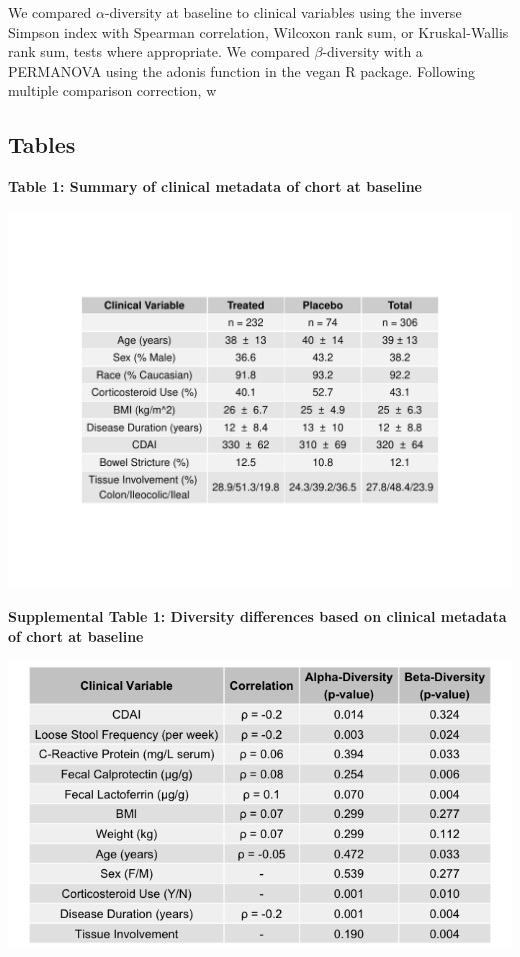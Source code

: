 \documentclass[11pt,]{article}
\begin{document}
We compared \({\alpha}\)-diversity at baseline to clinical variables
using the inverse Simpson index with Spearman correlation, Wilcoxon rank
sum, or Kruskal-Wallis rank sum, tests where appropriate. We compared
\({\beta}\)-diversity with a PERMANOVA using the adonis function in the
vegan R package. Following multiple comparison correction, w

\newpage

\subsection{Tables}\label{tables}

\textbf{Table 1: Summary of clinical metadata of chort at baseline}

\includegraphics{tables/Table1_baseline_metadata.pdf}

\newpage

\textbf{Supplemental Table 1: Diversity differences based on clinical
metadata of chort at baseline}

\includegraphics{tables/Supp.table1_cohortdiversity.png}
\end{document}
